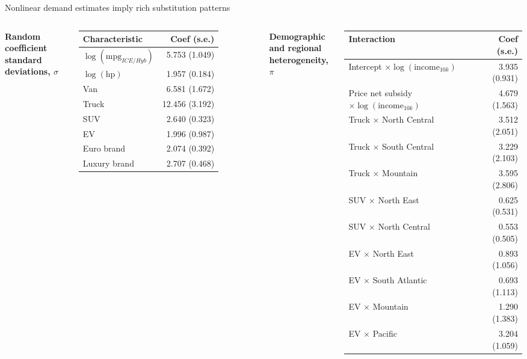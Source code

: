 \documentclass[aspectratio=169,11pt]{beamer}
\newcommand{\srcnote}[1]{\par\vspace{0.3em}{\scriptsize\textcolor{muted}{#1}}\par}
\begin{document}
\begin{frame}{Nonlinear demand estimates imply rich substitution patterns}
  \scriptsize
  \begin{columns}[T,onlytextwidth]
      \textbf{Random coefficient standard deviations, \(\sigma\)}
      \vspace{0.1cm}
      \begin{tabular}{lr}
        \toprule
        Characteristic & Coef (s.e.) \\
        \midrule
        \(\log(\text{mpg}_{ICE/Hyb})\) & 5.753 (1.049) \\
        \(\log(\text{hp})\) & 1.957 (0.184) \\
        Van & 6.581 (1.672) \\
        Truck & 12.456 (3.192) \\
        SUV & 2.640 (0.323) \\
        EV & 1.996 (0.987) \\
        Euro brand & 2.074 (0.392) \\
        Luxury brand & 2.707 (0.468) \\
        \bottomrule
      \end{tabular}
      \textbf{Demographic and regional heterogeneity, \(\pi\)}
      \vspace{0.1cm}
      \begin{tabular}{lr}
        \toprule
        Interaction & Coef (s.e.) \\
        \midrule
        Intercept \(\times \log(\text{income}_{10k})\) & 3.935 (0.931) \\
        Price net subsidy \(\times \log(\text{income}_{10k})\) & 4.679 (1.563) \\
        Truck \(\times\) North Central & 3.512 (2.051) \\
        Truck \(\times\) South Central & 3.229 (2.103) \\
        Truck \(\times\) Mountain & 3.595 (2.806) \\
        SUV \(\times\) North East & 0.625 (0.531) \\
        SUV \(\times\) North Central & 0.553 (0.505) \\
        EV \(\times\) North East & 0.893 (1.056) \\
        EV \(\times\) South Atlantic & 0.693 (1.113) \\
        EV \(\times\) Mountain & 1.290 (1.383) \\
        EV \(\times\) Pacific & 3.204 (1.059) \\
        \bottomrule
      \end{tabular}
  \end{columns}
  \srcnote{Standard errors clustered by model.}
\end{frame}
\end{document}
